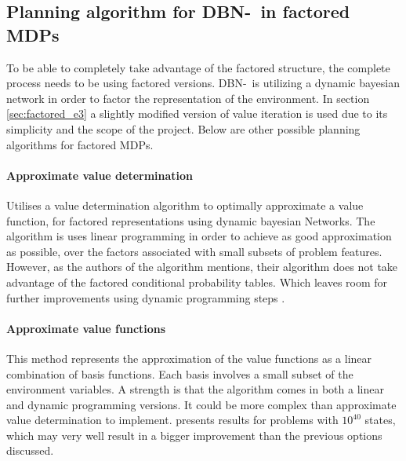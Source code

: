 \subsection{Planning algorithm for DBN-\etre\ in factored MDPs}
\label{sec:better_planing_algos}

To be able to completely take advantage of the factored structure, the complete
process needs to be using factored versions. DBN-\etre\ is utilizing a dynamic
bayesian network in order to factor the representation of the environment. In
section \ref{sec:factored_e3} a slightly modified version of value iteration is
used due to its simplicity and the scope of the project. Below are other
possible planning algorithms for factored MDPs.

\paragraph{Approximate value determination}

Utilises a value determination algorithm to optimally approximate a value
function, for factored representations using dynamic bayesian Networks. The
algorithm is uses linear programming in order to achieve as good approximation
as possible, over the factors associated with small subsets of problem
features. However, as the authors of the algorithm mentions, their algorithm
does not take advantage of the factored conditional probability tables. Which
leaves room for further improvements using dynamic programming steps
\parencite{koller1999computing}.

\paragraph{Approximate value functions}

This method represents the approximation of the value functions as a linear
combination of basis functions. Each basis involves a small subset of the
environment variables. A strength is that the algorithm comes in both a linear
and dynamic programming versions. It could be more complex than approximate
value determination to implement. \textcite{guestrin2003efficient} presents
results for problems with $10^{40}$ states, which may very well result in a
bigger improvement than the previous options discussed.
